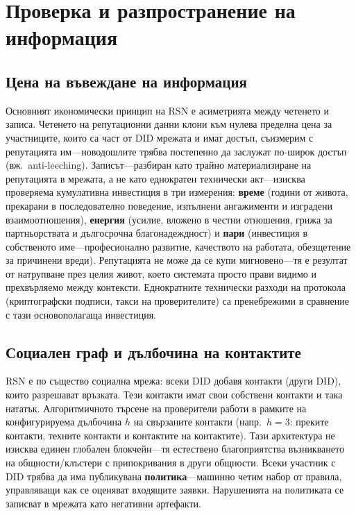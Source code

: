 \documentclass[11pt,a4paper,twocolumn]{article}
\begin{document}
\section{Проверка и разпространение на информация}

\subsection{Цена на въвеждане на информация}

Основният икономически принцип на RSN е асиметрията между четенето и записа. Четенето на репутационни данни клони към нулева пределна цена за участниците, които са част от DID мрежата и имат достъп, съизмерим с репутацията им---новодошлите трябва постепенно да заслужат по-широк достъп (вж.\ anti-leeching). Записът---разбиран като трайно материализиране на репутацията в мрежата, а не като еднократен технически акт---изисква проверяема кумулативна инвестиция в три измерения: \textbf{време} (години от живота, прекарани в последователно поведение, изпълнени ангажименти и изградени взаимоотношения), \textbf{енергия} (усилие, вложено в честни отношения, грижа за партньорствата и дългосрочна благонадеждност) и \textbf{пари} (инвестиция в собственото име---професионално развитие, качеството на работата, обезщетение за причинени вреди). Репутацията не може да се купи мигновено---тя е резултат от натрупване през целия живот, което системата просто прави видимо и прехвърляемо между контексти. Еднократните технически разходи на протокола (криптографски подписи, такси на проверителите) са пренебрежими в сравнение с тази основополагаща инвестиция.

\subsection{Социален граф и дълбочина на контактите}

RSN е по същество социална мрежа: всеки DID добавя контакти (други DID), които разрешават връзката. Тези контакти имат свои собствени контакти и така нататък. Алгоритмичното търсене на проверители работи в рамките на конфигурируема дълбочина $h$ на свързаните контакти (напр.\ $h=3$: преките контакти, техните контакти и контактите на контактите). Тази архитектура не изисква единен глобален блокчейн---тя естествено благоприятства възникването на общности/клъстери с припокривания в други общности. Всеки участник с DID трябва да има публикувана \textbf{политика}---машинно четим набор от правила, управляващи как се оценяват входящите заявки. Нарушенията на политиката се записват в мрежата като негативни артефакти.
\end{document}
